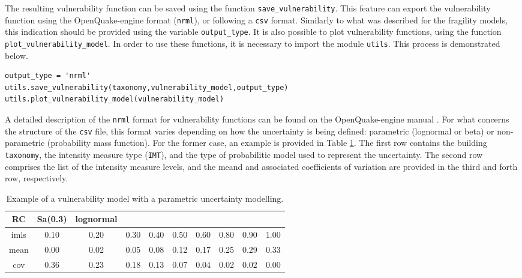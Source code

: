 The resulting vulnerability function can be saved using the function \verb=save_vulnerability=. This feature can export the vulnerability function using the OpenQuake-engine format (\verb=nrml=), or following a \verb=csv= format. Similarly to what was described for the fragility models, this indication should be provided using the variable \verb=output_type=. It is also possible to plot vulnerability functions, using the function \verb=plot_vulnerability_model=. In order to use these functions, it is necessary to import the module \verb=utils=. This process is demonstrated below. 

\begin{Verbatim}[frame=single, commandchars=\\\{\}, samepage=true]
output_type = 'nrml'
utils.save_vulnerability(taxonomy,vulnerability_model,output_type)
utils.plot_vulnerability_model(vulnerability_model)
\end{Verbatim}

A detailed description of the \verb=nrml= format for vulnerability functions can be found on the OpenQuake-engine manual \citep{GEM2015}. For what concerns the structure of the \verb=csv= file, this format varies depending on how the uncertainty is being defined: parametric (lognormal or beta) or non-parametric (probability mass function). For the former case, an example is provided in Table \ref{table:vf_cont_csv}. The first row contains the building \verb=taxonomy=, the intensity measure type (\verb=IMT=), and the type of probabilitic model used to represent the uncertainty. The second row comprises the list of the intensity measure levels, and the meand and associated coefficients of variation are provided in the third and forth row, respectively.

\begin {table}[htb]
\caption{Example of a vulnerability model with a parametric uncertainty modelling.}
\label{table:vf_cont_csv}
\begin{center}
  \begin{tabular}{ | c | c | c | c | c | c | c | c | c | c |}
  \hline
RC & Sa(0.3) & lognormal &  &  &  &  &  &  & \\ \hline
imls & 0.10 & 0.20 & 0.30 & 0.40 & 0.50 & 0.60 & 0.80 & 0.90 & 1.00\\ \hline
mean & 0.00 & 0.02 & 0.05 & 0.08 & 0.12 & 0.17 & 0.25 & 0.29 & 0.33\\ \hline
cov & 0.36 & 0.23 & 0.18 & 0.13 & 0.07 & 0.04 & 0.02 & 0.02 & 0.00\\ \hline
  \end{tabular}
\end{center}
\end{table}

